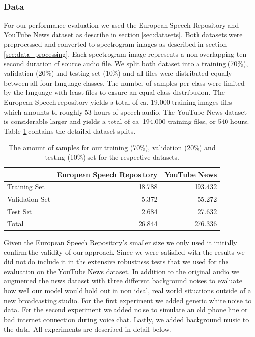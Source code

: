 \subsubsection{Data} 
\label{sec:data}
For our performance evaluation we used the European Speech Repository and YouTube News dataset as describe in section \ref{sec:datasets}. Both datasets were preprocessed and converted to spectrogram images as described in section \ref{sec:data_processing}. Each spectrogram image represents a non-overlapping ten second duration of source audio file. 
We split both dataset into a training (70\%), validation (20\%) and testing set (10\%) and all files were distributed equally between all four language classes. The number of samples per class were limited by the language with least files to ensure an equal class distribution. The European Speech repository yields a total of ca. 19.000 training images files which amounts to roughly 53 hours of speech audio. The YouTube News dataset is considerable larger and yields a total of ca .194.000 training files, or 540 hours. Table \ref{tab:data_splits} contains the detailed dataset splits.

	\begin{table}[]
	\centering
	\begin{tabularx}{\textwidth}{lrr}
	\toprule
	  				& European Speech Repository & YouTube News\\ \midrule
	Training Set    & 18.788						 & 193.432 \\
	Validation Set  & 5.372						 & 55.272 \\
	Test Set        & 2.684						 & 27.632 \\
	\midrule
	Total           & 26.844						 & 276.336 \\
	\bottomrule
	\end{tabularx}
	\caption{The amount of samples for our training (70\%), validation (20\%) and testing (10\%) set for the respective datasets.}
	\label{tab:data_splits}
	\end{table}

Given the European Speech Repository's smaller size we only used it initially confirm the validity of our approach. Since we were satisfied with the results we did not do include it in the extensive robustness tests that we used for the evaluation on the YouTube News dataset. In addition to the original audio we augmented the news dataset with three different background noises to evaluate how well our model would hold out in non ideal, real world situations outside of a new broadcasting studio. For the first experiment we added generic white noise to data. For the second experiment we added noise to simulate an old phone line or bad internet connection during voice chat. Lastly, we added background music to the data. All experiments are described in detail below.


